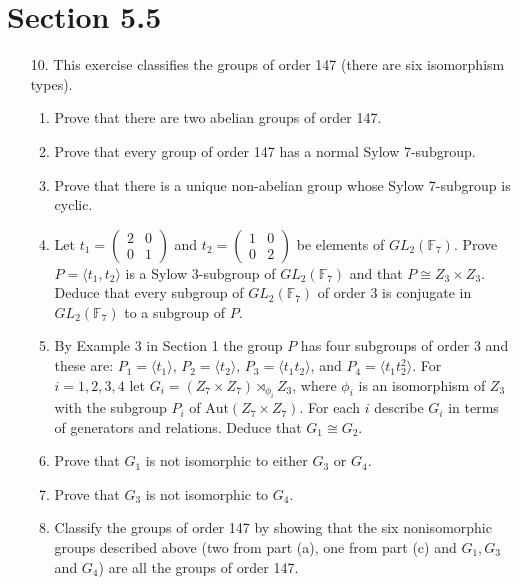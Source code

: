 \documentclass[12pt,leqno]{book}
\theoremstyle{definition}
\newcommand{\F}{\mathbb{F}}
\begin{document}
\section*{Section 5.5}
\begin{enumerate}
 \item [10.] This exercise classifies the groups of order 147 (there are six isomorphism types).
  \begin{enumerate}
   \item Prove that there are two abelian groups of order 147.
   \item Prove that every group of order 147 has a normal Sylow 7-subgroup.
   \item Prove that there is a unique non-abelian group whose Sylow 7-subgroup is cyclic.
   \item Let $t_1=\begin{pmatrix}2&0\\0&1\end{pmatrix}$ and $t_2=\begin{pmatrix}1&0\\0&2\end{pmatrix}$ be elements of $GL_2(\F_7)$. Prove $P=\langle t_1,t_2\rangle$ is a Sylow 3-subgroup of $GL_2(\F_7)$ and that $P\cong Z_3\times Z_3$. Deduce that every subgroup of $GL_2(\F_7)$ of order 3 is conjugate in $GL_2(\F_7)$ to a subgroup of $P$.
   \item By Example 3 in Section 1 the group $P$ has four subgroups of order 3 and these are: $P_1=\langle t_1\rangle$, $P_2=\langle t_2\rangle$, $P_3=\langle t_1t_2\rangle$, and $P_4=\langle t_1t_2^2\rangle$. For $i=1,2,3,4$ let $G_i=(Z_7\times Z_7)\rtimes_{\phi_i}Z_3$, where $\phi_i$ is an isomorphism of $Z_3$ with the subgroup $P_i$ of $\text{Aut}(Z_7\times Z_7)$. For each $i$ describe $G_i$ in terms of generators and relations. Deduce that $G_1\cong G_2$.
   \item Prove that $G_1$ is not isomorphic to either $G_3$ or $G_4$. 
   \item Prove that $G_3$ is not isomorphic to $G_4$.
   \item Classify the groups of order 147 by showing that the six nonisomorphic groups described above (two from part (a), one from part (c) and $G_1,G_3$ and $G_4$) are all the groups of order 147. 
  \end{enumerate}


\end{enumerate}
\end{document}
